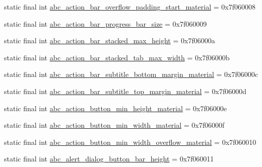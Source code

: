 \begin{DoxyCompactItemize}
\item 
static final int \mbox{\hyperlink{classandroid_1_1support_1_1v7_1_1appcompat_1_1R_1_1dimen_ab0dff4068408e6b4044c261131d4cc03}{abc\+\_\+action\+\_\+bar\+\_\+overflow\+\_\+padding\+\_\+start\+\_\+material}} = 0x7f060008
\item 
static final int \mbox{\hyperlink{classandroid_1_1support_1_1v7_1_1appcompat_1_1R_1_1dimen_a7cb8745e240f51173be9c254cf5fe2b8}{abc\+\_\+action\+\_\+bar\+\_\+progress\+\_\+bar\+\_\+size}} = 0x7f060009
\item 
static final int \mbox{\hyperlink{classandroid_1_1support_1_1v7_1_1appcompat_1_1R_1_1dimen_a895826cc4d8c704a417035e05dd41304}{abc\+\_\+action\+\_\+bar\+\_\+stacked\+\_\+max\+\_\+height}} = 0x7f06000a
\item 
static final int \mbox{\hyperlink{classandroid_1_1support_1_1v7_1_1appcompat_1_1R_1_1dimen_ad577ba39fef87f3d70dbf199191d5656}{abc\+\_\+action\+\_\+bar\+\_\+stacked\+\_\+tab\+\_\+max\+\_\+width}} = 0x7f06000b
\item 
static final int \mbox{\hyperlink{classandroid_1_1support_1_1v7_1_1appcompat_1_1R_1_1dimen_aa35e5ba3767493b71859fbf99eb089ea}{abc\+\_\+action\+\_\+bar\+\_\+subtitle\+\_\+bottom\+\_\+margin\+\_\+material}} = 0x7f06000c
\item 
static final int \mbox{\hyperlink{classandroid_1_1support_1_1v7_1_1appcompat_1_1R_1_1dimen_a00dc0188d267f39f6d85e3df16988c20}{abc\+\_\+action\+\_\+bar\+\_\+subtitle\+\_\+top\+\_\+margin\+\_\+material}} = 0x7f06000d
\item 
static final int \mbox{\hyperlink{classandroid_1_1support_1_1v7_1_1appcompat_1_1R_1_1dimen_a371d25b458b3088905b862916bde0dcd}{abc\+\_\+action\+\_\+button\+\_\+min\+\_\+height\+\_\+material}} = 0x7f06000e
\item 
static final int \mbox{\hyperlink{classandroid_1_1support_1_1v7_1_1appcompat_1_1R_1_1dimen_a4c445ec74d6c280421733fc114f2b3a3}{abc\+\_\+action\+\_\+button\+\_\+min\+\_\+width\+\_\+material}} = 0x7f06000f
\item 
static final int \mbox{\hyperlink{classandroid_1_1support_1_1v7_1_1appcompat_1_1R_1_1dimen_a6b22c0a5d1378b0cbb2175d8c950d84d}{abc\+\_\+action\+\_\+button\+\_\+min\+\_\+width\+\_\+overflow\+\_\+material}} = 0x7f060010
\item 
static final int \mbox{\hyperlink{classandroid_1_1support_1_1v7_1_1appcompat_1_1R_1_1dimen_a9b3e9a1fbd18f79de50390bef3db6a50}{abc\+\_\+alert\+\_\+dialog\+\_\+button\+\_\+bar\+\_\+height}} = 0x7f060011
\item 

\end{DoxyCompactItemize}
